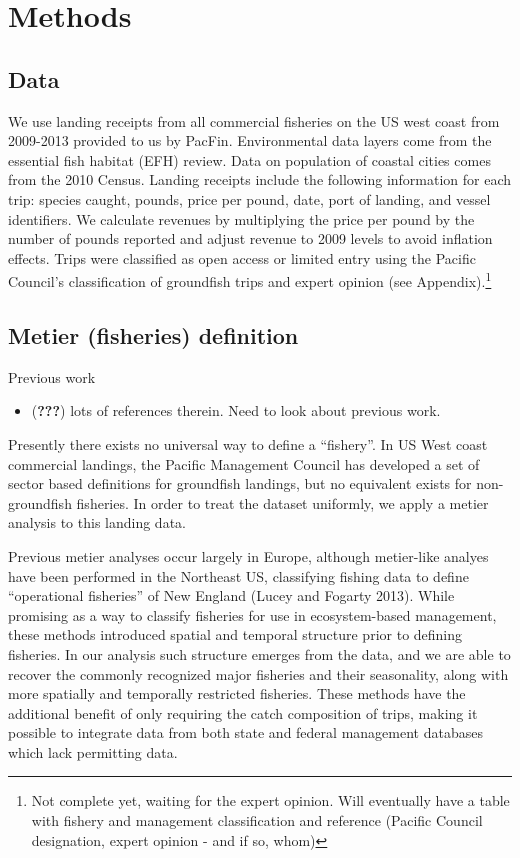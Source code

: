 \documentclass[]{article}
\let\rmarkdownfootnote\footnote%
\def\footnote{\protect\rmarkdownfootnote}
\begin{document}
\section{Methods}\label{methods}

\subsection{Data}\label{data}

We use landing receipts from all commercial fisheries on the US west
coast from 2009-2013 provided to us by PacFin. Environmental data layers
come from the essential fish habitat (EFH) review. Data on population of
coastal cities comes from the 2010 Census. Landing receipts include the
following information for each trip: species caught, pounds, price per
pound, date, port of landing, and vessel identifiers. We calculate
revenues by multiplying the price per pound by the number of pounds
reported and adjust revenue to 2009 levels to avoid inflation effects.
Trips were classified as open access or limited entry using the Pacific
Council's classification of groundfish trips and expert opinion (see
Appendix).\footnote{Not complete yet, waiting for the expert opinion.
  Will eventually have a table with fishery and management
  classification and reference (Pacific Council designation, expert
  opinion - and if so, whom)}

\subsection{Metier (fisheries)
definition}\label{metier-fisheries-definition}

Previous work

\begin{itemize}
\itemsep1pt\parskip0pt
\item
  ({\textbf{???}}) lots of references therein. Need to look about
  previous work.
\end{itemize}

Presently there exists no universal way to define a ``fishery''. In US
West coast commercial landings, the Pacific Management Council has
developed a set of sector based definitions for groundfish landings, but
no equivalent exists for non-groundfish fisheries. In order to treat the
dataset uniformly, we apply a metier analysis to this landing data.

Previous metier analyses occur largely in Europe, although metier-like
analyes have been performed in the Northeast US, classifying fishing
data to define ``operational fisheries'' of New England (Lucey and
Fogarty 2013). While promising as a way to classify fisheries for use in
ecosystem-based management, these methods introduced spatial and
temporal structure prior to defining fisheries. In our analysis such
structure emerges from the data, and we are able to recover the commonly
recognized major fisheries and their seasonality, along with more
spatially and temporally restricted fisheries. These methods have the
additional benefit of only requiring the catch composition of trips,
making it possible to integrate data from both state and federal
management databases which lack permitting data.
\end{document}
